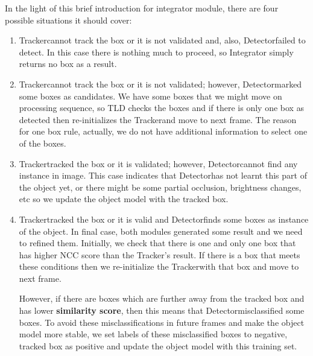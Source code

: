 \documentclass{report}
\newcommand{\Tracker}{Tracker}
\newcommand{\Detector}{Detector}
\begin{document}
            In the light of this brief introduction for integrator module, there are four possible situations it should cover:
            \begin{enumerate}
                \item \Tracker cannot track the box or it is not validated and, also, \Detector failed to detect.
                    In this case there is nothing much to proceed, so Integrator simply returns no box as a result.
                \item \Tracker cannot track the box or it is not validated; however, \Detector marked some boxes as candidates.
                    We have some boxes that we might move on processing sequence, so TLD checks the boxes and if there is only one
                    box as detected then re-initializes the \Tracker and move to next frame. The reason for one box rule, actually,
                    we do not have additional information to select one of the boxes.
                \item \Tracker tracked the box or it is validated; however, \Detector cannot find any instance in image.
                    This case indicates that \Detector has not learnt this part of the object yet, or there might be some
                    partial occlusion, brightness changes, etc so we update the object model with the tracked box.
                \item \Tracker tracked the box or it is valid and \Detector finds some boxes as instance of the object.
                    In final case, both modules generated some result and we need to refined them. Initially, we check that there is one
                    and only one box that has higher NCC score than the \Tracker's result. If there is a box that meets these conditions
                    then we re-initialize the \Tracker with that box and move to next frame.

                    However, if there are boxes which are further away from the tracked box and has lower \textbf{similarity score},
                    then this means that \Detector misclassified some boxes. To avoid these misclassifications in future frames and
                    make the object model more stable, we set labels of these misclassified boxes to negative,
                    tracked box as positive and update the object model with this training set.
            \end{enumerate}
\end{document}
